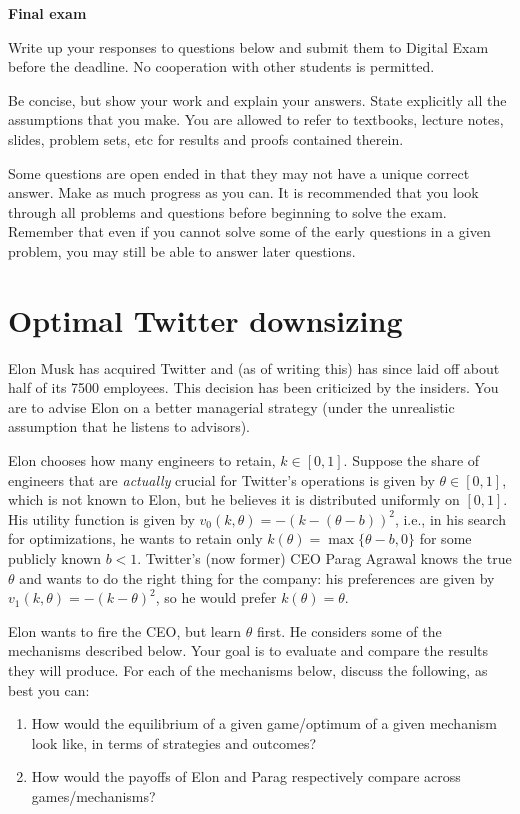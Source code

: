 \documentclass[a4paper]{article}
\newif\ifsolutions
\begin{document}
{\ifsolutions \else	
	
\fi}

\begin{center}
		\LARGE\textbf{Final exam {\ifsolutions solutions \fi}}
\end{center}

{\ifsolutions \else	
Write up your responses to questions below and submit them to Digital Exam before the deadline. No cooperation with other students is permitted.

Be concise, but show your work and explain your answers. State explicitly all the assumptions that you make. You are allowed to refer to textbooks, lecture notes, slides, problem sets, etc for results and proofs contained therein.

Some questions are open ended in that they may not have a unique correct answer. Make as much progress as you can. It is recommended that you look through all problems and questions before beginning to solve the exam. Remember that even if you cannot solve some of the early questions in a given problem, you may still be able to answer later questions. 
\fi}



\section{Optimal Twitter downsizing}

Elon Musk has acquired Twitter and (as of writing this) has since laid off about half of its 7500 employees. This decision has been criticized by the insiders. You are to advise Elon on a better managerial strategy (under the unrealistic assumption that he listens to advisors).

Elon chooses how many engineers to retain, $k \in [0,1]$. Suppose the share of engineers that are \emph{actually} crucial for Twitter's operations is given by $\theta \in [0,1]$, which is not known to Elon, but he believes it is distributed uniformly on $[0,1]$. His utility function is given by $v_0(k,\theta) = -(k-(\theta-b))^2$, i.e., in his search for optimizations, he wants to retain only $k(\theta) = \max\{\theta-b, 0\}$ for some publicly known $b<1$.
Twitter's (now former) CEO Parag Agrawal knows the true $\theta$ and wants to do the right thing for the company: his preferences are given by $v_1(k,\theta) = - (k - \theta)^2$, so he would prefer $k(\theta) = \theta$.

Elon wants to fire the CEO, but learn $\theta$ first. He considers some of the mechanisms described below. Your goal is to evaluate and compare the results they will produce. For each of the mechanisms below, discuss the following, as best you can:
\begin{enumerate}
	\item How would the equilibrium of a given game/optimum of a given mechanism look like, in terms of strategies and outcomes?
	\item How would the payoffs of Elon and Parag respectively compare across games/mechanisms?
\end{enumerate}
\end{document}
